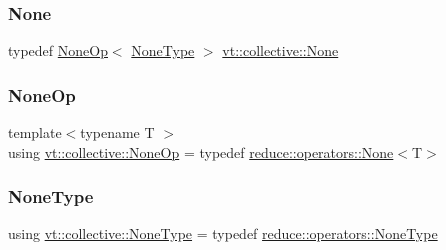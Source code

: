 \mbox{\label{namespacevt_1_1collective_ab9abd77f58f0ede6d24462b95d0a1989}} 
\subsubsection{\texorpdfstring{None}{None}}
{\footnotesize\ttfamily typedef \hyperlink{namespacevt_1_1collective_a812e9225d75c8888457b29f971c33f75}{None\+Op}$<$ \hyperlink{namespacevt_1_1collective_af988b64711231f96d33ebfaf891e52a4}{None\+Type} $>$ \hyperlink{namespacevt_1_1collective_ab9abd77f58f0ede6d24462b95d0a1989}{vt\+::collective\+::\+None}}

\mbox{\label{namespacevt_1_1collective_a812e9225d75c8888457b29f971c33f75}} 
\subsubsection{\texorpdfstring{None\+Op}{NoneOp}}
{\footnotesize\ttfamily template$<$typename T $>$ \\
using \hyperlink{namespacevt_1_1collective_a812e9225d75c8888457b29f971c33f75}{vt\+::collective\+::\+None\+Op} = typedef \hyperlink{structvt_1_1collective_1_1reduce_1_1operators_1_1_none}{reduce\+::operators\+::\+None}$<$T$>$}

\mbox{\label{namespacevt_1_1collective_af988b64711231f96d33ebfaf891e52a4}} 
\subsubsection{\texorpdfstring{None\+Type}{NoneType}}
{\footnotesize\ttfamily using \hyperlink{namespacevt_1_1collective_af988b64711231f96d33ebfaf891e52a4}{vt\+::collective\+::\+None\+Type} = typedef \hyperlink{namespacevt_1_1collective_1_1reduce_1_1operators_a1e8a587884de5e874a701ee300ca247c}{reduce\+::operators\+::\+None\+Type}}

\mbox{\label{namespacevt_1_1collective_a47e3b11aa019f643f23effceb60ee94a}} 
